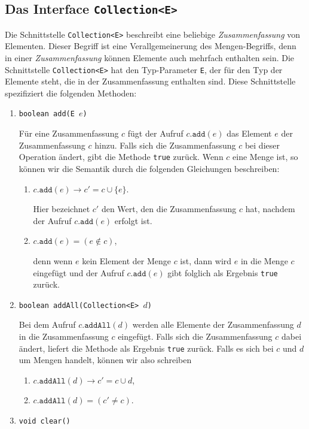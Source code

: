\subsection{Das Interface \texttt{Collection<E>}}
Die Schnittstelle \texttt{Collection<E>} beschreibt eine beliebige \emph{Zusammenfassung} von
Elementen.  Dieser Begriff ist eine Verallgemeinerung des Mengen-Begriffs, denn
in einer \emph{Zusammenfassung} k\"onnen Elemente auch mehrfach enthalten sein.
Die Schnittstelle \texttt{Collection<E>} hat den Typ-Parameter \texttt{E}, der f\"ur den
Typ der Elemente steht, die in der Zusammenfassung enthalten sind.
Diese Schnittstelle spezifiziert die folgenden Methoden:
\begin{enumerate}
\item \texttt{boolean add(E $e$)}
  
      F\"ur eine Zusammenfassung $c$ f\"ugt der Aufruf $c.\mathtt{add}(e)$ das Element
      $e$ der Zusammenfassung $c$ hinzu.  Falls sich die Zusammenfassung $c$ bei
      dieser Operation \"andert, gibt die Methode \texttt{true} zur\"uck.
      Wenn $c$ eine Menge ist, so k\"onnen wir die Semantik durch die folgenden
      Gleichungen beschreiben:
      \begin{enumerate}
      \item $c.\mathtt{add}(e) \rightarrow c' = c \cup \{ e \}$.

            Hier bezeichnet $c'$ den Wert, den die Zusammenfassung $c$ hat, nachdem
            der Aufruf $c.\mathtt{add}(e)$ erfolgt ist.
      \item $c.\mathtt{add}(e) = (e \notin c)$,

            denn wenn $e$ kein Element der Menge  $c$ ist, dann wird $e$ in die Menge $c$
            eingef\"ugt und der Aufruf $c.\mathtt{add}(e)$ gibt folglich als
            Ergebnis \texttt{true} zur\"uck.
      \end{enumerate}
\item \texttt{boolean addAll(Collection<E> $d$)} 

      Bei dem Aufruf $c.\mathtt{addAll}(d)$ werden alle Elemente der Zusammenfassung
      $d$ in die Zusammenfassung $c$ eingef\"ugt.  Falls sich die Zusammenfassung $c$
      dabei \"andert, liefert die Methode als Ergebnis \texttt{true} zur\"uck.
      Falls es sich bei $c$ und $d$ um Mengen handelt, k\"onnen wir also schreiben
      \begin{enumerate}
      \item $c.\mathtt{addAll}(d) \rightarrow c' = c \cup d$,
      \item $c.\mathtt{addAll}(d) = (c' \not= c)$.
      \end{enumerate}
\item \texttt{void clear()}


\end{enumerate}
